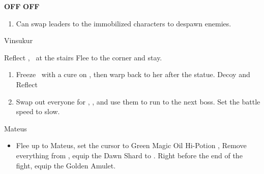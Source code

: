 \begin{gambit}
	\begin{itemize}
		\vaanf \textbf{OFF}
		\penelof \textbf{OFF}
	\end{itemize}
\end{gambit}
\begin{enumerate}
	\item Can swap leaders to the immobilized characters to despawn enemies.
\end{enumerate}
\begin{battle}{Vinsukur}
	\begin{itemize}
		\vaanf Reflect \ashe, \penelo\ at the stairs
		\vaanf Flee to the corner and stay.
	\end{itemize}
\end{battle}
\begin{enumerate}
	\item Freeze \penelo\ with a cure on \vaan, then warp back to her after the statue.
	      \vaan Decoy and Reflect \vaan
	\item Swap out everyone for \balthier, \basch, and use them to run to the next boss. Set the battle speed to slow.
\end{enumerate}
\begin{battle}{Mateus}
	\begin{itemize}
		\item Flee up to Mateus, set the cursor to Green Magic
		      \penelof Oil \penelo
		      \vaanf Hi-Potion \vaan, Remove everything from \basch, equip the Dawn Shard to \vaan. Right before the end of the fight, equip the Golden Amulet.
	\end{itemize}
\end{battle}
